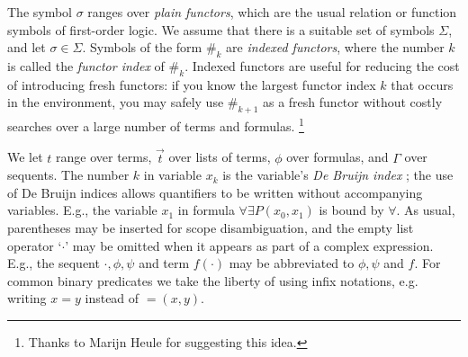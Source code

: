 \documentclass[12pt]{article}
\newcommand{\idf}[1]{\#_{#1}}
\begin{document}
The symbol $\sigma$ ranges over \textit{plain functors}, which are the usual relation or function 
symbols of first-order logic. We assume that there is a suitable set of symbols $\Sigma$, and let 
$\sigma \in \Sigma$. Symbols of the form $\idf{k}$ are \textit{indexed functors}, where the number 
$k$ is called the \textit{functor index} of $\idf{k}$. Indexed functors are useful for reducing
the cost of introducing fresh functors: if you know the largest functor index $k$ that occurs in the 
environment, you may safely use $\idf{k+1}$ as a fresh functor without costly searches over a large 
number of terms and formulas. \footnote{Thanks to Marijn Heule for suggesting this idea.}

We let $t$ range over terms, $\vec{t}$ over lists of terms, $\phi$ over formulas, 
and $\Gamma$ over sequents. The number $k$ in variable $x_k$ is the variable's 
\textit{De Bruijn index} \cite{de1972lambda}; the use of De Bruijn indices allows 
quantifiers to be written without accompanying variables. E.g., the variable $x_1$ 
in formula $\forall \exists P(x_0,x_1)$ is bound by $\forall$. As usual, parentheses may be 
inserted for scope disambiguation, and the empty list operator `$\cdot$' may be omitted when 
it appears as part of a complex expression. E.g., the sequent $\cdot, \phi, \psi$ and term 
$f(\cdot)$ may be abbreviated to $\phi, \psi$ and $f$. For common binary predicates we take 
the liberty of using infix notations, e.g. writing $x = y$ instead of $=(x,y)$. 


\end{document}
